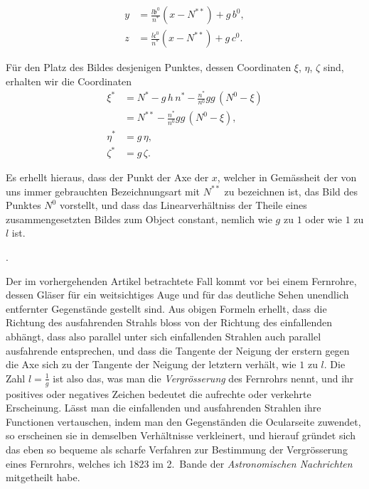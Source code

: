 \documentclass[11pt,a4paper]{article}
\begin{document}
\newpage
\noindent
\begin{align*}
y &= \tfrac{l\mathfrak{b}^0}{n^*}(x - N^{**}) + g\,b^0, \\
z &= \tfrac{l\mathfrak{c}^0}{n^*}(x - N^{**}) + g\,c^0.
\end{align*}

Für den Platz des Bildes desjenigen Punktes, dessen Coordinaten $\xi$, $\eta$, $\zeta$ sind, erhalten wir die Coordinaten
\begin{align*}
\xi^* &= N^* - g\,h\,n^* - \tfrac{n^*}{n^0} g g\,(N^0 - \xi) \\
      &= N^{**} - \tfrac{n^*}{n^0} g g\,(N^0 - \xi), \\
\eta^* &= g\,\eta, \\
\zeta^* &= g\,\zeta.
\end{align*}

Es erhellt hieraus, dass der Punkt der Axe der $x$, welcher in Gemässheit der von uns immer gebrauchten Bezeichnungsart mit $N^{**}$ zu bezeichnen ist, das Bild des Punktes $N^0$ vorstellt, und dass das Linearverhältniss der Theile eines zusammengesetzten Bildes zum Object constant, nemlich wie $g$ zu $1$ oder wie $1$ zu $l$ ist.

\bigskip{}.

\smallskip
Der im vorhergehenden Artikel betrachtete Fall kommt vor bei einem Fernrohre, dessen Gläser für ein weitsichtiges Auge und für das deutliche Sehen unendlich entfernter Gegenstände gestellt sind. Aus obigen Formeln erhellt, dass die Richtung des ausfahrenden Strahls bloss von der Richtung des einfallenden abhängt, dass also parallel unter sich einfallenden Strahlen auch parallel ausfahrende entsprechen, und dass die Tangente der Neigung der erstern gegen die Axe sich zu der Tangente der Neigung der letztern verhält, wie $1$ zu $l$. Die Zahl $l = \frac{1}{g}$ ist also das, was man die \textit{Vergrösserung} des Fernrohrs nennt, und ihr positives oder negatives Zeichen bedeutet die aufrechte oder verkehrte Erscheinung. Lässt man die einfallenden und ausfahrenden Strahlen ihre Functionen vertauschen, indem man den Gegenständen die Ocularseite zuwendet, so erscheinen sie in demselben Verhältnisse verkleinert, und hierauf gründet sich das eben so bequeme als scharfe Verfahren zur Bestimmung der Vergrösserung eines Fernrohrs, welches ich 1823 im 2.~Bande der \textit{Astronomischen Nachrichten} mitgetheilt habe.
\end{document}
